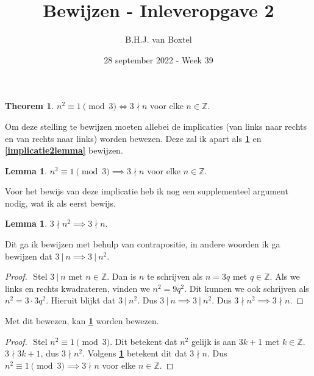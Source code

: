 \documentclass[12pt, dutch, a4paper]{article}
\theoremstyle{definition}
\newtheorem{theorem}{Theorem}
\newtheorem{lemma}{Lemma}[theorem]
\newtheorem{sublemma}{Lemma}[lemma]
\begin{document}
\title{Bewijzen - Inleveropgave 2}
\author{B.H.J. van Boxtel}
\date{28 september 2022 - Week 39} 

\maketitle
{} %

\begin{theorem} \label{maintheorem}
    $n^2 \equiv 1 \pmod{3} \iff 3 \nmid n$ voor elke $n \in \mathbb{Z}$. 
\end{theorem}   

Om deze stelling te bewijzen moeten allebei de implicaties 
(van links naar rechts en van rechts naar links) worden bewezen. Deze zal ik apart
als \textbf{\cref{implicatie1lemma}} en \textbf{\cref{implicatie2lemma}} bewijzen.

\begin{lemma} \label{implicatie1lemma}
    $n^2 \equiv 1 \pmod{3} \implies 3 \nmid n$ voor elke $n \in \mathbb{Z}$. 
\end{lemma}
Voor het bewijs van deze implicatie heb ik nog een supplementeel argument nodig, 
wat ik als eerst bewijs. 

\begin{sublemma}
    $3 \nmid n^2 \implies 3 \nmid n$.
\end{sublemma}

Dit ga ik bewijzen met behulp van contrapositie, in andere woorden ik ga bewijzen dat
$3 \: | \: n \implies 3 \: | \: n^2$.
\begin{proof} $ $\newline
    Stel $3 \: | \: n$ met $n \in \mathbb{Z}$. \newline
    Dan is $n$ te schrijven als $n = 3q$ met $q \in \mathbb{Z}$. \newline
    Als we links en rechts kwadrateren, 
    vinden we $n^2 = 9q^2$. \newline
    Dit kunnen we ook schrijven als $n^2 = 3 \cdot 3q^2$. \newline
    Hieruit blijkt dat $3 \: | \: n^2$. \newline 
    Dus $3 \: | \: n \implies 3 \: | \: n^2$. \newline
    Dus $3 \nmid n^2 \implies 3 \nmid n$.
\end{proof}

Met dit bewezen, kan \textbf{\cref{implicatie1lemma}} worden bewezen.
\begin{proof} $ $\newline
    Stel $n^2 \equiv 1 \pmod{3}$. \newline
    Dit betekent dat $n^2$ gelijk is aan $3k+1$ met $k \in \mathbb{Z}$. \newline
    $3 \nmid 3k + 1$, dus $3 \nmid n^2$. \newline
    Volgens \textbf{\cref{implicatie1lemma}} betekent dit dat $3 \nmid n$. \newline
    Dus $n^2 \equiv 1 \pmod{3} \implies 3 \nmid n$ voor elke $n \in \mathbb{Z}$.
\end{proof}
\end{document}
